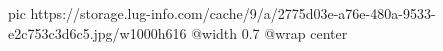  
 
 
 
 

\ifcmt
  pic https://storage.lug-info.com/cache/9/a/2775d03e-a76e-480a-9533-e2c753c3d6c5.jpg/w1000h616
  @width 0.7
	@wrap center
\fi
